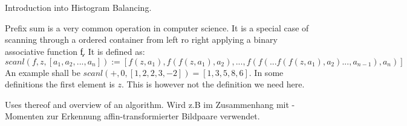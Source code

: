    
\section{\algo}

  Introduction into Histogram Balancing.
  
  Prefix sum is a very common operation in computer science. It is a special
    case of scanning through a ordered container from left ro right applying a binary
    associative function \c{f}.
    It is defined as:
      $$ scanl(f,z,[a_1,a_2,...,a_n])
         := [f(z,a_1),f(f(z,a_1),a_2),...,f(f(...f(f(z,a_1),a_2)...,a_{n-1}),a_n)]
      $$
    An example shall be $scanl(+,0,[1,2,2,3,-2]) = [1,3,5,8,6]$. In some definitions
    the first element is $z$. This is however not the definition we need here.
    
  
  Uses thereof and overview of an algorithm.
  Wird z.B im Zusammenhang mit \mu-Momenten zur Erkennung
    affin-transformierter Bildpaare verwendet.
